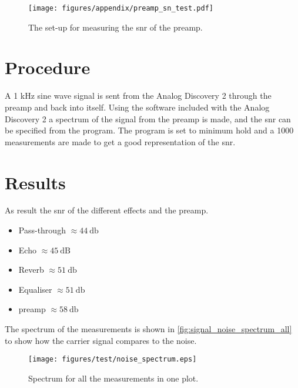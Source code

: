 \begin{figure}[hbpt]
	\centering
	\texttt{[image: figures/appendix/preamp\_sn\_test.pdf]}
	\caption{The set-up for measuring the \gls{snr} of the \gls{preamp}.}
	\label{fig:signal_noise_preamp}
\end{figure}


\section{Procedure}
A 1 kHz sine wave signal is sent from the Analog Discovery 2 through the \gls{preamp} and back into itself. Using the software included with the Analog Discovery 2 a spectrum of the signal from the \gls{preamp} is made, and the \gls{snr} can be specified from the program. The program is set to minimum hold and a 1000 measurements are made to get a good representation of the \gls{snr}. 

\section{Results}
As result the \gls{snr} of the different effects and the \gls{preamp}.

\begin{itemize}
	\item Pass-through $\approx \SI{44}{\decibel}$	
	\item Echo $\approx \SI{45}{\deci\bel}$ 
	\item Reverb $\approx \SI{51}{\decibel}$
	\item Equaliser $\approx \SI{51}{\decibel}$
	\item \gls{preamp} $\approx \SI{58}{\decibel}$
\end{itemize}

The spectrum of the measurements is shown in \autoref{fig:signal_noise_spectrum_all} to show how the carrier signal compares to the noise.

\begin{figure}[htbp]
	\centering
	\texttt{[image: figures/test/noise\_spectrum.eps]}
	\caption{Spectrum for all the measurements in one plot.}
	\label{fig:signal_noise_spectrum_all}
\end{figure}